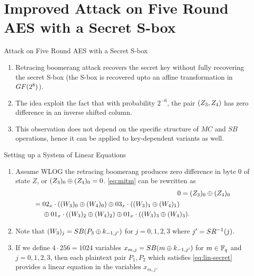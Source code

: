 \documentclass[notheorems]{beamer}
\theoremstyle{definition}
\theoremstyle{example}
\begin{document}
    \section[Secret S-Boxes]{Improved Attack on Five Round AES with a Secret S-box}
    \label{sec:secret-s-box}

    \begin{frame}[<+->]{Attack on Five Round AES with a Secret S-box}
        \begin{enumerate}
            \item Retracing boomerang attack recovers the secret key without
            fully recovering the secret S-box (the S-box is recovered upto an
            affine transformation in \(GF(2^8)\)).
            \item The idea exploit the fact that with probability \(2^{-6}\),
            the pair \((Z_3, Z_4)\) has zero difference in an inverse
            shifted column.
            \item This observation does not depend on the specific structure of
            \(MC\) and \(SB\) operations, hence it can be applied to
            key-dependent variants as well.
        \end{enumerate}
    \end{frame}

    \begin{frame}[<+->]{Setting up a System of Linear Equations}
        \begin{enumerate}
            \item Assume WLOG the retracing boomerang produces zero difference
            in byte 0 of state \(Z\), or \((Z_3)_0 \oplus (Z_4)_0 =
            0\). \eqref{eq:mitm} can be rewritten as
            \begin{align}
                0 ={}&(Z_3)_0 \oplus (Z_4)_0 \\
                \begin{split}
                    ={}& 02_x \cdot ((W_3)_0 \oplus (W_4)_0) \oplus 03_x \cdot ((W_3)_1 \oplus (W_4)_1) \\
                    &\oplus 01_x \cdot ((W_3)_2 \oplus (W_4)_2) \oplus 01_x \cdot ((W_3)_3 \oplus (W_4)_3).
                \end{split}
                \label{eq:lin-secret}
            \end{align}
            \item Note that \((W_3)_j = SB(P_3 \oplus k_{-1,
            j^\prime})\) for \(j = 0, 1, 2, 3\) where \(j^\prime =
            SR^{-1}(j)\).
            \item If we define \(4 \cdot 256 = 1024\) variables \(x_{m,j} =
            SB(m \oplus k_{-1, j^\prime})\) for \(m \in \mathbb F_q\) and \(j =
            0, 1, 2, 3\), then each plaintext pair \(P_1, P_2\) which satisfies
            \eqref{eq:lin-secret} provides a linear equation in the variables
            \(x_{m,j}\).
            \seti
        \end{enumerate}    
    \end{frame}
\end{document}
